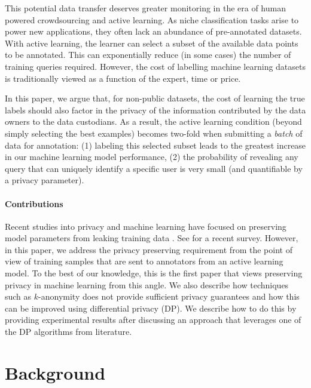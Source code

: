 \documentclass[letterpaper]{article}
\begin{document}
This potential data transfer deserves greater monitoring in the era of  human powered crowdsourcing and active learning. As niche classification tasks arise to power new applications, they often lack an abundance of pre-annotated datasets. With active learning, the learner can select a subset of the available data points to be annotated. This can exponentially reduce \cite{settles1648active} (in some cases) the number of training queries required. However, the cost \cite{dasgupta2011two,arora2009estimating,settles1648active} of labelling machine learning datasets is traditionally viewed as a function of the expert, time or price.

In this paper, we argue that, for non-public datasets, the cost of learning the true labels should also factor in the privacy of the information contributed by the data owners to the data custodians. As a result, the active learning condition (beyond simply selecting the best examples) becomes two-fold when submitting a \textit{batch} of data for annotation: (1) labeling this selected subset leads to the greatest increase in our machine learning model performance, (2) the probability of revealing any query that can uniquely identify a specific user is very small (and quantifiable by a privacy parameter).

\paragraph{Contributions}
Recent studies into privacy and machine learning have focused on preserving model parameters from leaking training data \cite{papernot2016semi,hamm2016learning}. See \cite{ji2014differential} for a recent survey. However, in this paper, we address the privacy preserving requirement from the point of view of training samples that are sent to annotators from an active learning model. To the best of our knowledge, this is the first paper that views preserving privacy in machine learning from this angle. We also describe how techniques such as $k$-anonymity does not provide sufficient privacy guarantees and how this can be improved using differential privacy (DP). We describe how to do this by providing experimental results after discussing an approach that leverages one of the DP algorithms from literature.

\section{Background}
\label{background}
\end{document}

